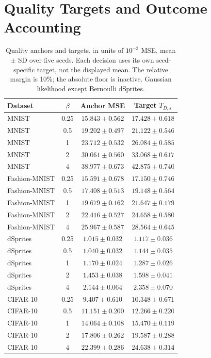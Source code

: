\documentclass[make,article,submit,pdftex,moreauthors]{Definitions/mdpi}
\begin{document}
\appendixstart
\appendix
\section{Quality Targets and Outcome Accounting}\label{app:targets}
\begin{table}[H]
\caption{Quality anchors and targets, in units of $10^{-3}$ MSE, mean $\pm$ SD over five seeds. Each decision uses its own seed-specific target, not the displayed mean. The relative margin is 10\%; the absolute floor is inactive. Gaussian likelihood except Bernoulli dSprites.}\label{tab:anchors}
\small
\setlength{\tabcolsep}{3.5pt}
\begin{tabular*}{\textwidth}{@{\extracolsep{\fill}}lccc@{}}
\toprule
Dataset & $\beta$ & Anchor MSE & Target $T_{D,s}$ \\
\midrule
MNIST & 0.25 & $15.843 \pm 0.562$ & $17.428 \pm 0.618$ \\
MNIST & 0.5 & $19.202 \pm 0.497$ & $21.122 \pm 0.546$ \\
MNIST & 1 & $23.712 \pm 0.532$ & $26.084 \pm 0.585$ \\
MNIST & 2 & $30.061 \pm 0.560$ & $33.068 \pm 0.617$ \\
MNIST & 4 & $38.977 \pm 0.673$ & $42.875 \pm 0.740$ \\
Fashion-MNIST & 0.25 & $15.591 \pm 0.678$ & $17.150 \pm 0.746$ \\
Fashion-MNIST & 0.5 & $17.408 \pm 0.513$ & $19.148 \pm 0.564$ \\
Fashion-MNIST & 1 & $19.679 \pm 0.162$ & $21.647 \pm 0.179$ \\
Fashion-MNIST & 2 & $22.416 \pm 0.527$ & $24.658 \pm 0.580$ \\
Fashion-MNIST & 4 & $25.967 \pm 0.587$ & $28.564 \pm 0.645$ \\
dSprites & 0.25 & $1.015 \pm 0.032$ & $1.117 \pm 0.036$ \\
dSprites & 0.5 & $1.040 \pm 0.032$ & $1.144 \pm 0.035$ \\
dSprites & 1 & $1.170 \pm 0.024$ & $1.287 \pm 0.026$ \\
dSprites & 2 & $1.453 \pm 0.038$ & $1.598 \pm 0.041$ \\
dSprites & 4 & $2.144 \pm 0.064$ & $2.358 \pm 0.070$ \\
CIFAR-10 & 0.25 & $9.407 \pm 0.610$ & $10.348 \pm 0.671$ \\
CIFAR-10 & 0.5 & $11.151 \pm 0.200$ & $12.266 \pm 0.220$ \\
CIFAR-10 & 1 & $14.064 \pm 0.108$ & $15.470 \pm 0.119$ \\
CIFAR-10 & 2 & $17.806 \pm 0.262$ & $19.587 \pm 0.288$ \\
CIFAR-10 & 4 & $22.399 \pm 0.286$ & $24.638 \pm 0.314$ \\
\bottomrule
\end{tabular*}
\end{table}
\end{document}
